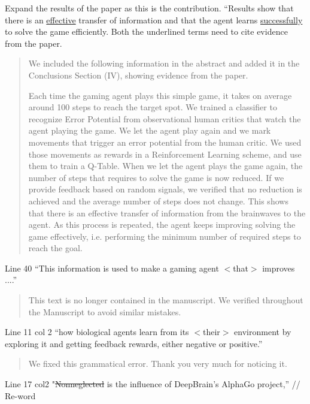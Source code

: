 \documentclass[journal,onecolumn,12pt]{IEEEtran}
\begin{document}
Expand the results of the paper as this is the contribution.
“Results show that there is an  \underline{effective} transfer of information and that the agent learns \underline{successfully} to solve the game efficiently.
Both the underlined terms need to cite evidence from the paper.

\begin{quotation}
{\color{blue}
We included the following information in the abstract and added it in the Conclusions Section (IV), showing evidence from the paper.

Each time the gaming agent plays this simple game, it takes on average around 100 steps to reach the target spot.  We trained a classifier to recognize Error Potential from observational human critics that watch the agent playing the game.  We let the agent play again and we mark movements that trigger an error potential from the human critic.  We used those movements as rewards in a Reinforcement Learning scheme, and use them to train a Q-Table.  When we let the agent plays the game again, the number of steps that requires to solve the game is now reduced.  If we provide feedback based on random signals, we verified that no reduction is achieved and the average number of steps does not change.   This shows that there is an effective transfer of information from the brainwaves to the agent.   As this process is repeated, the agent keeps improving solving the game effectively, i.e. performing the minimum number of required steps to reach the goal.

}
\end{quotation}

Line 40 “This information is used to make a gaming agent $<$that$>$ improves ....”

\begin{quotation}
{\color{blue}
This text is no longer contained in the manuscript.  We verified throughout the Manuscript to avoid similar mistakes.
}
\end{quotation}

Line 11 col 2 “how biological agents learn from its $<$their$>$ environment by exploring it and getting feedback rewards, either negative or positive.”

\begin{quotation}
{\color{blue}
We fixed this grammatical error.  Thank you very much for noticing it.
}
\end{quotation}

Line 17 col2 "\sout{Nonneglected} is the influence of DeepBrain’s AlphaGo project,” // Re-word
\end{document}
